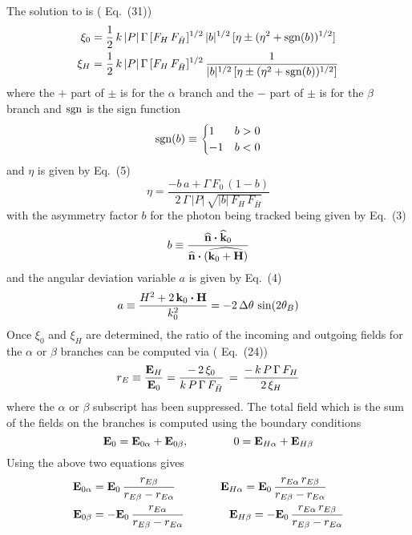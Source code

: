 The solution to  is (\cite{b:batterman} Eq.~(31))
\begin{align}
  \xi_0 &= \frac{1}{2} \, k \, |P| \, \Gamma \, [F_H \, F_{\bar H}]^{1/2} \, 
    |b|^{1/2} \, [\eta \pm (\eta^2 + {\text{sgn}}(b))^{1/2}] \nonumber \\
  \xi_H &= \frac{1}{2} \, k \, |P| \, \Gamma \, [F_H \, F_{\bar H}]^{1/2} \, 
    \frac{1}{|b|^{1/2} \, [\eta \pm (\eta^2 + {\text{sgn}}(b))^{1/2}]}
\end{align}
where the $+$ part of $\pm$ is for the $\alpha$ branch and the $-$ part of $\pm$ is for the $\beta$
branch and ${\text{sgn}}$ is the sign function
\begin{equation}
  {\text{sgn}}(b) \equiv \begin{cases} 1 & b > 0 \\ -1 & b < 0 \end{cases}
\end{equation}
and $\eta$ is given by \cite{b:blasdell} Eq.~(5)
\begin{equation}
  \eta = \frac{-b \, a + \Gamma \, F_0 \, (1 - b)}{2 \, \Gamma \, |P| \, \sqrt{|b| \, F_H \, F_{\bar H}}}
\end{equation}
with the asymmetry factor $b$ for the photon being tracked being given by \cite{b:blasdell} Eq.~(3)
\begin{equation}
  b \equiv \frac{{\widehat{\bf n}} \mathbin{\boldsymbol{\cdot}} {\widehat{\bf k}}_0}{{\widehat{\bf n}} \mathbin{\boldsymbol{\cdot}} (\widehat{{{\bf k}_0 + {\bf H}}})}
\end{equation}
and the angular deviation variable $a$ is given by \cite{b:blasdell} Eq.~(4)
\begin{equation}
  a \equiv \frac{H^2 + 2 \, {\bf k}_0 \mathbin{\boldsymbol{\cdot}} {\bf H}}{k_0^2} 
  = -2 \, \Delta \theta \, \sin(2\theta_B)
\end{equation}
Once $\xi_0$ and $\xi_H$ are determined, the ratio of the incoming and outgoing fields for the
$\alpha$ or $\beta$ branches can be computed via (\cite{b:batterman} Eq.~(24))
\begin{equation}
  r_E \equiv \frac{{\bf E}_H}{{\bf E}_0} 
  = \frac{- \, 2 \, \xi_0}{k \, P \, \Gamma \, F_{\bar H}} \,
  = \, \frac{- \, k \, P \, \Gamma \, F_H}{2 \, \xi_H} 
\end{equation}
where the $\alpha$ or $\beta$ subscript has been suppressed.  The total field which is the sum of the
fields on the branches is computed using the boundary conditions
\begin{equation}
  {\bf E}_0 = {\bf E}_{0\alpha} + {\bf E}_{0\beta}, \qquad\qquad 
  0 = {\bf E}_{H\alpha} + {\bf E}_{H\beta}
\end{equation}
Using the above two equations gives
\begin{align}
  {\bf E}_{0\alpha} &= {\bf E}_0 \, \frac{r_{E\beta}}{r_{E\beta} - r_{E\alpha}} \qquad\qquad
  {\bf E}_{H\alpha}  = {\bf E}_0 \, \frac{r_{E\alpha} \, r_{E\beta}}{r_{E\beta} - r_{E\alpha}} \nonumber \\
  {\bf E}_{0\beta} &= -{\bf E}_0 \, \frac{r_{E\alpha}}{r_{E\beta} - r_{E\alpha}} \qquad\qquad
  {\bf E}_{H\beta}  = -{\bf E}_0 \, \frac{r_{E\alpha} \, r_{E\beta}}{r_{E\beta} - r_{E\alpha}} 
\end{align}

